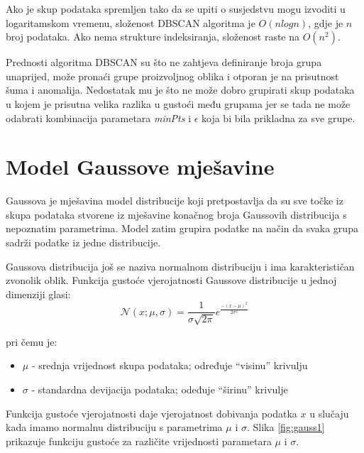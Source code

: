 \documentclass[utf8, diplomski, numeric]{fer}
\begin{document}
Ako je skup podataka spremljen tako da se upiti o susjedstvu mogu izvoditi u logaritamskom vremenu, složenost DBSCAN algoritma je $O(n log n)$, gdje je $n$ broj podataka. Ako nema strukture indeksiranja, složenost raste na $O(n^2)$.

Prednosti algoritma DBSCAN su što ne zahtjeva definiranje broja grupa unaprijed, može pronaći grupe proizvoljnog oblika i otporan je na prisutnost šuma i anomalija. Nedostatak mu je što ne može dobro grupirati skup podataka u kojem je prisutna velika razlika u gustoći među grupama jer se tada ne može odabrati kombinacija parametara \textit{minPts} i $\epsilon$ koja bi bila prikladna za sve grupe. 

\section{Model Gaussove mješavine}

Gaussova je mješavina model distribucije koji pretpostavlja da su sve točke iz skupa podataka stvorene iz mješavine konačnog broja Gaussovih distribucija s nepoznatim parametrima. Model zatim grupira podatke na način da svaka grupa sadrži podatke iz jedne distribucije.

Gaussova distribucija još se naziva normalnom distribuciju i ima karakterističan zvonolik oblik. Funkcija gustoće vjerojatnosti Gaussove distribucije u jednoj dimenziji glasi:
\begin{equation} \label{eq:gauss1}
\mathcal{N}(x;\mu,\sigma) = \frac{1}{{\sigma \sqrt {2\pi } }}e^{\frac{-(x - \mu)^2 }{2\sigma ^2 }}
\end{equation}

pri čemu je:
\begin{itemize}
\item $\mu$ - srednja vrijednost skupa podataka; određuje ``visinu'' krivulju
\item $\sigma$ - standardna devijacija podataka; odeđuje ``širinu'' krivulje
\end{itemize}

Funkcija gustoće vjerojatnosti daje vjerojatnost dobivanja podatka $x$ u slučaju kada imamo normalnu distribuciju s parametrima $\mu$ i $\sigma$. Slika \ref{fig:gauss1} prikazuje funkciju gustoće za različite vrijednosti parametara $\mu$ i $\sigma$.
\end{document}
